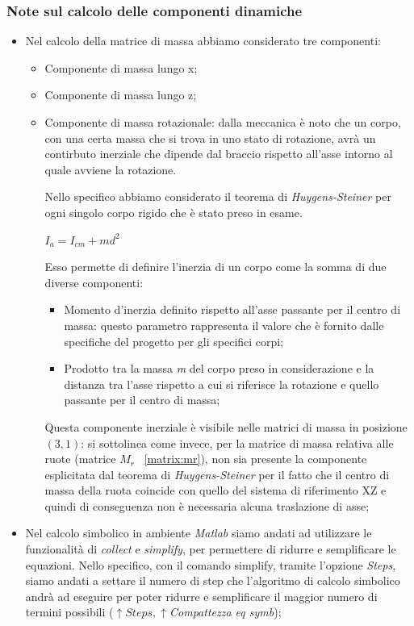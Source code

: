 \subsubsection{Note sul calcolo delle componenti dinamiche}
\begin{itemize}
	\item Nel calcolo della matrice di massa abbiamo considerato tre componenti:
	\begin{itemize}
		\item Componente di massa lungo x;
		\item Componente di massa lungo z;
		\item Componente di massa rotazionale: dalla meccanica è noto che un corpo, con una certa massa che si trova in uno stato di rotazione, avrà un contirbuto inerziale che dipende dal braccio rispetto all'asse intorno al quale avviene la rotazione.
		
		Nello specifico abbiamo considerato il teorema di \textit{Huygens-Steiner} per ogni singolo corpo rigido che è stato preso in esame.
		
		\begin{center}
			$ I_a = I_{cm} + md^2 $	
		\end{center}
		
		Esso permette di definire l'inerzia di un corpo come la somma di due diverse componenti:
		\begin{itemize}
			\item Momento d'inerzia definito rispetto all'asse passante per il centro di massa: questo parametro rappresenta il valore che è fornito dalle specifiche del progetto per gli specifici corpi;
			\item Prodotto tra la massa \textit{m} del corpo preso in considerazione e la distanza tra l'asse rispetto a cui si riferisce la rotazione e quello passante per il centro di massa;
		\end{itemize}
	
		Questa componente inerziale è visibile nelle matrici di massa in posizione $(3, 1)$: si sottolinea come invece, per la matrice di massa relativa alle ruote (matrice $M_r$ ~\ref{matrix:mr}), non sia presente la componente esplicitata dal teorema di \textit{Huygens-Steiner} per il fatto che il centro di massa della ruota coincide con quello del sistema di riferimento XZ e quindi di conseguenza non è necessaria alcuna traslazione di asse;
 	\end{itemize}
 	\item Nel calcolo simbolico in ambiente \textit{Matlab} siamo andati ad utilizzare le funzionalità di \textit{collect} e \textit{simplify}, per permettere di ridurre e semplificare le equazioni. Nello specifico, con il comando simplify, tramite l'opzione \textit{Steps}, siamo andati a settare il numero di step che l'algoritmo di calcolo simbolico andrà ad eseguire per poter ridurre e semplificare il maggior numero di termini possibili ($\uparrow Steps, \uparrow $\textit{Compattezza eq symb});
 	

\end{itemize}
